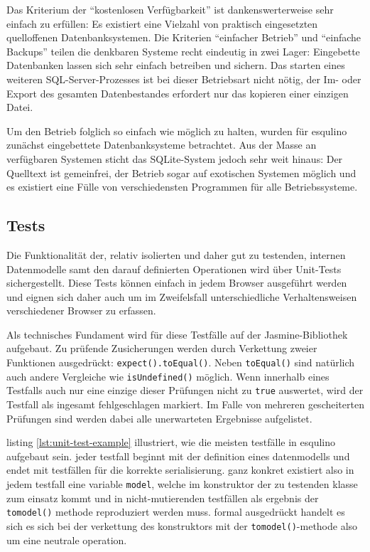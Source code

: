 Das Kriterium der ``kostenlosen Verfügbarkeit'' ist dankenswerterweise sehr einfach zu erfüllen: Es existiert eine Vielzahl von praktisch eingesetzten quelloffenen Datenbanksystemen. Die Kriterien ``einfacher Betrieb'' und ``einfache Backups'' teilen die denkbaren Systeme recht eindeutig in zwei Lager: Eingebette Datenbanken lassen sich sehr einfach betreiben und sichern. Das starten eines weiteren SQL-Server-Prozesses ist bei dieser Betriebsart nicht nötig, der Im- oder Export des gesamten Datenbestandes erfordert nur das kopieren einer einzigen Datei.

Um den Betrieb folglich so einfach wie möglich zu halten, wurden für esqulino zunächst eingebettete Datenbanksysteme betrachtet. Aus der Masse an verfügbaren Systemen sticht das SQLite-System jedoch sehr weit hinaus: Der Quelltext ist gemeinfrei, der Betrieb sogar auf exotischen Systemen möglich und es existiert eine Fülle von verschiedensten Programmen für alle Betriebssysteme.


\subsection{Tests}

Die Funktionalität der, relativ isolierten und daher gut zu testenden, internen Datenmodelle samt den darauf definierten Operationen wird über Unit-Tests sichergestellt. Diese Tests können einfach in jedem Browser ausgeführt werden und eignen sich daher auch um im Zweifelsfall unterschiedliche Verhaltensweisen verschiedener Browser zu erfassen.

Als technisches Fundament wird für diese Testfälle auf der Jasmine-Bibliothek aufgebaut. Zu prüfende Zusicherungen werden durch Verkettung zweier Funktionen ausgedrückt: \lstinline{expect().toEqual()}. Neben \lstinline{toEqual()} sind natürlich auch andere Vergleiche wie \lstinline{isUndefined()} möglich. Wenn innerhalb eines Testfalls auch nur eine einzige dieser Prüfungen nicht zu \lstinline{true} auswertet, wird der Testfall als ingesamt fehlgeschlagen markiert. Im Falle von mehreren gescheiterten Prüfungen sind werden dabei alle unerwarteten Ergebnisse aufgelistet.

listing \ref{lst:unit-test-example} illustriert, wie die meisten testfälle in esqulino aufgebaut sein. jeder testfall beginnt mit der definition eines datenmodells und endet mit testfällen für die korrekte serialisierung. ganz konkret existiert also in jedem testfall eine variable \lstinline{model}, welche im konstruktor der zu testenden klasse zum einsatz kommt und in nicht-mutierenden testfällen als ergebnis der \lstinline{tomodel()} methode reproduziert werden muss. formal ausgedrückt handelt es sich es sich bei der verkettung des konstruktors mit der \lstinline{tomodel()}-methode also um eine neutrale operation.

